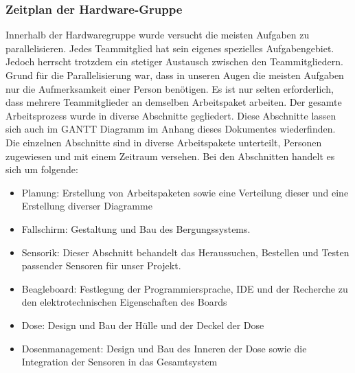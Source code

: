 \subsubsection{Zeitplan der Hardware-Gruppe}
Innerhalb der Hardwaregruppe wurde versucht die meisten Aufgaben zu parallelisieren. Jedes Teammitglied hat sein eigenes spezielles Aufgabengebiet. Jedoch herrscht trotzdem ein stetiger Austausch zwischen den Teammitgliedern. Grund für die Parallelisierung war, dass in unseren Augen die meisten Aufgaben  nur die Aufmerksamkeit einer Person benötigen. Es ist nur selten erforderlich, dass mehrere Teammitglieder an demselben Arbeitspaket arbeiten. Der gesamte Arbeitsprozess wurde in diverse Abschnitte gegliedert. Diese Abschnitte lassen sich auch im GANTT Diagramm im Anhang dieses Dokumentes wiederfinden. Die einzelnen Abschnitte sind in diverse Arbeitspakete unterteilt, Personen zugewiesen und mit einem Zeitraum versehen. Bei den Abschnitten handelt es sich um folgende:
\begin{itemize}
\item Planung: Erstellung von Arbeitspaketen sowie eine Verteilung dieser und eine Erstellung diverser Diagramme
\item Fallschirm: Gestaltung und Bau des Bergungssystems.
\item Sensorik: Dieser Abschnitt behandelt das Heraussuchen, Bestellen und Testen passender Sensoren für unser Projekt.
\item Beagleboard: Festlegung der Programmiersprache, IDE und der Recherche zu den elektrotechnischen Eigenschaften des Boards
\item Dose: Design und Bau der Hülle und der Deckel der Dose
\item Dosenmanagement: Design und Bau des Inneren der Dose sowie die Integration der Sensoren in das Gesamtsystem
\end{itemize}

